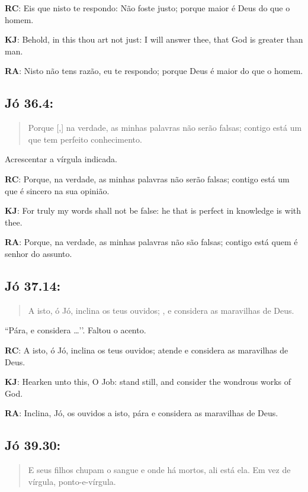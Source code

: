 \textbf{RC}: Eis que nisto te respondo: Não foste justo; porque maior é Deus do que o homem.

\textbf{KJ}: Behold, in this thou art not just: I will answer thee, that God is greater than man.

\textbf{RA}: Nisto não tens razão, eu te respondo; porque Deus é maior do que o homem.

\subsection*{Jó 36.4:} 
 \begin{quote}
    \small
Porque [,] na verdade, as minhas palavras não serão falsas; contigo está um que tem perfeito conhecimento.
\end{quote}

Acrescentar a vírgula indicada.

\textbf{RC}: Porque, na verdade, as minhas palavras não serão falsas; contigo está um que é sincero na sua opinião.

\textbf{KJ}: For truly my words shall not be false: he that is perfect in knowledge is with thee.

\textbf{RA}: Porque, na verdade, as minhas palavras não são falsas; contigo está quem é senhor do assunto.

\subsection*{Jó 37.14:} 
 \begin{quote}
    \small
A isto, ó Jó, inclina os teus ouvidos; , e considera as maravilhas de Deus.
\end{quote}

``Pára, e considera \ldots’’. Faltou o acento.

\textbf{RC}: A isto, ó Jó, inclina os teus ouvidos; atende e considera as maravilhas de Deus.

\textbf{KJ}: Hearken unto this, O Job: stand still, and consider the wondrous works of God.

\textbf{RA}: Inclina, Jó, os ouvidos a isto, pára e considera as maravilhas de Deus.

\subsection*{Jó 39.30:} 
 \begin{quote}
    \small
E seus filhos chupam o sangue\uwave{,} e onde há mortos, ali está ela.
Em vez de vírgula, ponto-e-vírgula. 
\end{quote}

